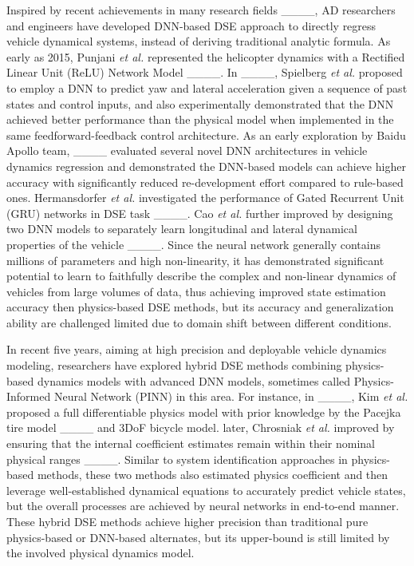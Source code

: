 Inspired by recent achievements in many research fields ____, AD researchers and engineers have developed DNN-based DSE approach to directly regress vehicle dynamical systems, instead of deriving traditional analytic formula. 
As early as 2015, Punjani \textit{et al.} represented the helicopter dynamics with a Rectified Linear Unit (ReLU) Network Model ____.
In ____, Spielberg \textit{et al.} proposed to employ a DNN to predict yaw and lateral acceleration given a sequence of past states and control inputs, and also experimentally demonstrated that the DNN achieved better performance than the physical model when implemented in the same feedforward-feedback control architecture. 
As an early exploration by Baidu Apollo team, ____ evaluated several novel DNN architectures in vehicle dynamics regression and demonstrated the DNN-based models can achieve higher accuracy with significantly reduced re-development effort compared to rule-based ones. 
Hermansdorfer \textit{et al.} investigated the performance of Gated Recurrent Unit (GRU) networks in DSE task ____.
Cao \textit{et al.} further improved by designing two DNN models to separately learn longitudinal and lateral dynamical properties of the vehicle ____. 
Since the neural network generally contains millions of parameters and high non-linearity, it has demonstrated significant potential to learn to faithfully describe the complex and non-linear dynamics of vehicles from large volumes of data, thus achieving improved state estimation accuracy then physics-based DSE methods, but its accuracy and generalization ability are challenged limited due to domain shift between different conditions.

In recent five years, aiming at high precision and deployable vehicle dynamics modeling, researchers have explored hybrid DSE methods combining physics-based dynamics models with advanced DNN models, sometimes called Physics-Informed Neural Network (PINN) in this area. 
For instance, in ____, Kim \textit{et al.} proposed a full differentiable physics model with prior knowledge by the Pacejka tire model ____ and 3DoF bicycle model. later, Chrosniak \textit{et al.} improved by ensuring that the internal coefficient estimates remain within their nominal physical ranges ____. Similar to system identification approaches in physics-based methods, these two methods also estimated physics coefficient and then leverage well-established dynamical equations to accurately predict vehicle states, but the overall processes are achieved by neural networks in end-to-end manner. These hybrid DSE methods achieve higher precision than traditional pure physics-based or DNN-based alternates, but its upper-bound is still limited by the involved physical dynamics model.

